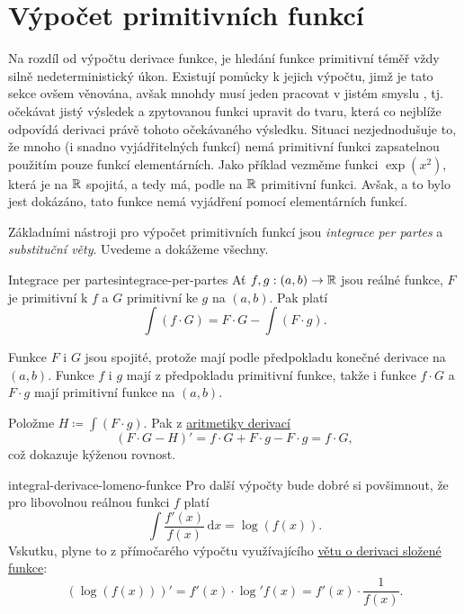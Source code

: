 \section{Výpočet primitivních funkcí}
\label{sec:vypocet-primitivnich-funkci}

Na rozdíl od výpočtu derivace funkce, je hledání funkce primitivní téměř vždy
silně nedeterministický úkon. Existují pomůcky k jejich výpočtu, jimž je tato
sekce ovšem věnována, avšak mnohdy musí jeden pracovat v jistém smyslu
, tj. očekávat jistý výsledek a zpytovanou funkci upravit do tvaru,
která co nejblíže odpovídá derivaci právě tohoto očekávaného výsledku. Situaci
nezjednodušuje to, že mnoho (i snadno vyjádřitelných funkcí) nemá primitivní
funkci zapsatelnou použitím pouze funkcí elementárních. Jako příklad vezměme
funkci $\exp(x^2)$, která je na $\mathbb{R}$ spojitá, a tedy má, podle
 na $\mathbb{R}$ primitivní
funkci. Avšak, a to bylo jest dokázáno, tato funkce nemá vyjádření pomocí
elementárních funkcí.

Základními nástroji pro výpočet primitivních funkcí jsou \emph{integrace per
partes} a \emph{substituční věty}. Uvedeme a dokážeme všechny.

\begin{theorem}{Integrace per partes}{integrace-per-partes}
 Ať $f,g:(a,b) \to \mathbb{R}$ jsou reálné funkce, $F$ je primitivní k $f$ a $G$
 primitivní ke $g$ na $(a,b)$. Pak platí
 \[
  \int (f \cdot G) = F \cdot G - \int (F \cdot g).
 \]
\end{theorem}
\begin{thmproof}
 Funkce $F$ i $G$ jsou spojité, protože mají podle předpokladu konečné derivace
 na $(a,b)$. Funkce $f$ i $g$ mají z předpokladu primitivní funkce, takže i
 funkce $f \cdot G$ a $F \cdot g$ mají primitivní funkce na $(a,b)$.

 Položme $H \coloneqq \int (F \cdot g)$. Pak z
 \hyperref[thm:aritmetika-derivaci]{aritmetiky derivací}
 \[
  (F \cdot G - H)' = f \cdot G + F \cdot g - F \cdot g = f \cdot G,
 \]
 což dokazuje kýženou rovnost.
\end{thmproof}

\begin{remark}{}{integral-derivace-lomeno-funkce}
 Pro další výpočty bude dobré si povšimnout, že pro libovolnou reálnou funkci
 $f$ platí
 \[
  \int \frac{f'(x)}{f(x)} \, \mathrm{d}x = \log(f(x)).
 \]
 Vskutku, plyne to z přímočarého výpočtu využívajícího
 \hyperref[thm:derivace-slozene-funkce]{větu o derivaci složené funkce}:
 \[
  (\log(f(x)))' = f'(x) \cdot \log'f(x) = f'(x) \cdot \frac{1}{f(x)}.
 \]
\end{remark}

